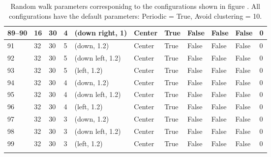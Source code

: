 \begin{longtable}{|C{0.9cm}|C{0.8cm}|C{0.8cm}|C{0.8cm}|C{3cm}|C{1.5cm}|C{1.5cm}|C{0.8cm}|C{0.8cm}|C{1cm}|C{1cm}|}
    89--90 &  16 &  30 &  4 & (down right, 1) & Center & True & False & False & False & 0 \\ \hline
    
    
    91 &  32 &  30 &  5 & (down, 1.2) & Center & True & False & False & False & 0 \\ \hline

    92 &  32 &  30 &  5 & (down left, 1.2) & Center & True & False & False & False & 0 \\ \hline

    93 &  32 &  30 &  5 & (left, 1.2) & Center & True & False & False & False & 0 \\ \hline

    94 &  32 &  30 &  4 & (down, 1.2) & Center & True & False & False & False & 0 \\ \hline

    95 &  32 &  30 &  4 & (down left, 1.2) & Center & True & False & False & False & 0 \\ \hline

    96 &  32 &  30 &  4 & (left, 1.2) & Center & True & False & False & False & 0 \\ \hline

    97 &  32 &  30 &  3 & (down, 1.2) & Center & True & False & False & False & 0 \\ \hline

    98 &  32 &  30 &  3 & (down left, 1.2) & Center & True & False & False & False & 0 \\ \hline

    99 &  32 &  30 &  3 & (left, 1.2) & Center & True & False & False & False & 0 \\ \hline
    \caption{Random walk parameters corresponidng to the configurations shown in figure . All configurations have the default parameters: Periodic = True, Avoid clustering = 10.}
    \label{tab:RW_details}
    \end{longtable}

%